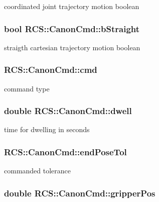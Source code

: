 coordinated joint trajectory motion boolean \hypertarget{structRCS_1_1CanonCmd_aee8ba85725943aa0102f3305a1bce2a7}{
\subsubsection[{b\-Straight}]{\setlength{\rightskip}{0pt plus 5cm}bool R\-C\-S\-::\-Canon\-Cmd\-::b\-Straight}}\label{structRCS_1_1CanonCmd_aee8ba85725943aa0102f3305a1bce2a7}
straigth cartesian trajectory motion boolean \hypertarget{structRCS_1_1CanonCmd_abf4d78b8604ce73d23d58f1fdcd7305e}{
\subsubsection[{cmd}]{ R\-C\-S\-::\-Canon\-Cmd\-::cmd}}\label{structRCS_1_1CanonCmd_abf4d78b8604ce73d23d58f1fdcd7305e}
command type \hypertarget{structRCS_1_1CanonCmd_a842c88485db006b71c7653e2a2159233}{
\subsubsection[{dwell}]{\setlength{\rightskip}{0pt plus 5cm}double R\-C\-S\-::\-Canon\-Cmd\-::dwell}}\label{structRCS_1_1CanonCmd_a842c88485db006b71c7653e2a2159233}
time for dwelling in seconds \hypertarget{structRCS_1_1CanonCmd_a11e66454d05007664d63cea7b35822c2}{
\subsubsection[{end\-Pose\-Tol}]{ R\-C\-S\-::\-Canon\-Cmd\-::end\-Pose\-Tol}}\label{structRCS_1_1CanonCmd_a11e66454d05007664d63cea7b35822c2}
commanded tolerance \hypertarget{structRCS_1_1CanonCmd_a03e23d97c74abd3c6b5b38aec8ae5fc2}{
\subsubsection[{gripper\-Pos}]{\setlength{\rightskip}{0pt plus 5cm}double R\-C\-S\-::\-Canon\-Cmd\-::gripper\-Pos}}\label{structRCS_1_1CanonCmd_a03e23d97c74abd3c6b5b38aec8ae5fc2}
